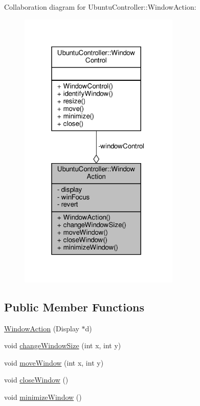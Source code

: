 Collaboration diagram for Ubuntu\+Controller\+:\+:Window\+Action\+:
\nopagebreak
\begin{figure}[H]
\begin{center}
\leavevmode
\includegraphics[width=217pt]{class_ubuntu_controller_1_1_window_action__coll__graph}
\end{center}
\end{figure}
\subsection*{Public Member Functions}
\begin{DoxyCompactItemize}
\item 
\hyperlink{class_ubuntu_controller_1_1_window_action_a1836cf300ad545fa88f33454d09765e1}{Window\+Action} (Display $\ast$d)
\item 
void \hyperlink{class_ubuntu_controller_1_1_window_action_ac7145d79c3b902a716d554d09e6e2a63}{change\+Window\+Size} (int x, int y)
\item 
void \hyperlink{class_ubuntu_controller_1_1_window_action_ae79c374bbbc84ff3dfb8565ede5f4220}{move\+Window} (int x, int y)
\item 
void \hyperlink{class_ubuntu_controller_1_1_window_action_a99150ce49f2956c56e64b6ba0246424f}{close\+Window} ()
\item 
void \hyperlink{class_ubuntu_controller_1_1_window_action_aa6f2b2543505c0c44027b501f151d4bf}{minimize\+Window} ()
\end{DoxyCompactItemize}
